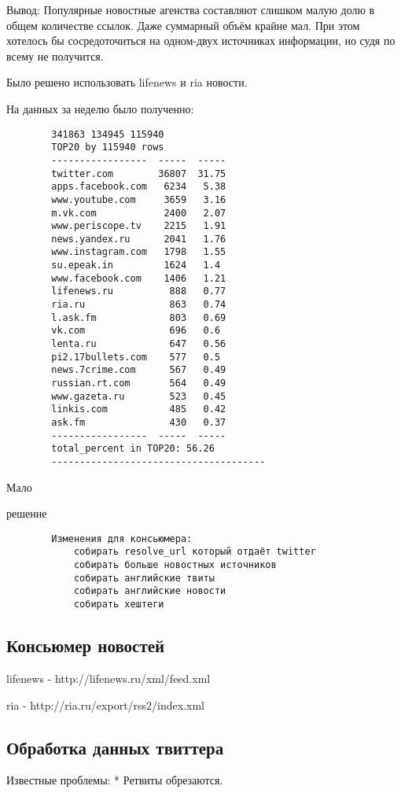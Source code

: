 


        Вывод:
        Популярные новостные агенства составляют слишком малую долю в общем количестве ссылок. Даже суммарный объём крайне мал. При этом хотелось бы сосредоточиться на одном-двух источниках информации, но судя по всему не получится.

        Было решено использовать lifenews и ria новости.

        На данных за неделю было полученно:
        \begin{verbatim}
        341863 134945 115940
        TOP20 by 115940 rows
        -----------------  -----  -----
        twitter.com        36807  31.75
        apps.facebook.com   6234   5.38
        www.youtube.com     3659   3.16
        m.vk.com            2400   2.07
        www.periscope.tv    2215   1.91
        news.yandex.ru      2041   1.76
        www.instagram.com   1798   1.55
        su.epeak.in         1624   1.4
        www.facebook.com    1406   1.21
        lifenews.ru          888   0.77
        ria.ru               863   0.74
        l.ask.fm             803   0.69
        vk.com               696   0.6
        lenta.ru             647   0.56
        pi2.17bullets.com    577   0.5
        news.7crime.com      567   0.49
        russian.rt.com       564   0.49
        www.gazeta.ru        523   0.45
        linkis.com           485   0.42
        ask.fm               430   0.37
        -----------------  -----  -----
        total_percent in TOP20: 56.26
        --------------------------------------
        \end{verbatim}

        Мало

        решение
        \begin{verbatim}
        Изменения для консьюмера:
            собирать resolve_url который отдаёт twitter
            собирать больше новостных источников
            собирать английские твиты
            собирать английские новости
            собирать хештеги
        \end{verbatim}

    \subsection{Консьюмер новостей}
        lifenews - http://lifenews.ru/xml/feed.xml

        ria - http://ria.ru/export/rss2/index.xml


    \subsection{Обработка данных твиттера}
        Известные проблемы: 
        * Ретвиты обрезаются.

